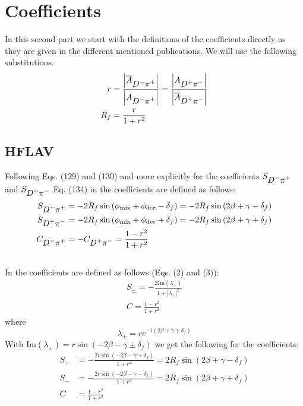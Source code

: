 \section{Coefficients}
\label{sec:coef}

In this second part we start with the definitions of the coefficients directly as they are given in the different mentioned publications.
We will use the following substitutions:
\begin{align*}
r &= \frac{\left|\overline{A}_{\mbox{\ensuremath{D^{-}\pi^{+}}}}\right|}{\left|A_{\mbox{\ensuremath{D^{-}\pi^{+}}}}\right|} = \frac{\left|A_{\mbox{\ensuremath{D^{+}\pi^{-}}}}\right|}{\left|\overline{A}_{\mbox{\ensuremath{D^{+}\pi^{-}}}}\right|}\\
R_f &= \frac{r}{1+r^2}
\end{align*}

\subsection{HFLAV}

Following Eqs. (129) and (130) and more explicitly for the coefficients $S_{\mbox{\ensuremath{D^{-}\pi^{+}}}}$ and $S_{\mbox{\ensuremath{D^{+}\pi^{-}}}}$ Eq. (134) in \cite{Amhis:2016xyh} the \CP
coefficients are defined as follows:
\begin{align}
S_{\mbox{\ensuremath{D^{-}\pi^{+}}}} &= -2R_f\sin\left(\phi_{\text{mix}}+\phi_{\text{dec}}-\delta_{f}\right) = -2R_f\sin\left(2\beta+\gamma-\delta_{f}\right)\\
S_{\mbox{\ensuremath{D^{+}\pi^{-}}}} &= -2R_f\sin\left(\phi_{\text{mix}}+\phi_{\text{dec}}+\delta_{f}\right) = -2R_f\sin\left(2\beta+\gamma+\delta_{f}\right)\\
C_{\mbox{\ensuremath{D^{-}\pi^{+}}}} &= -C_{\mbox{\ensuremath{D^{+}\pi^{-}}}} = \frac{1-r^2}{1+r^2}
\end{align}

\subsection{\babar}

In \cite{Aubert:2006tw} the \CP coefficients are defined as follows (Eqs. (2) and (3)):
\begin{align}
S_{\pm}=-\frac{2\text{Im}\left(\lambda_{\pm}\right)}{1+\left|\lambda_{\pm}\right|^2}\\
C=\frac{1-r^2}{1+r^2}
\end{align}
where
\begin{equation}
\lambda_\pm=r e^{-i\left(2\beta+\gamma\mp\delta_f\right)}
\end{equation}
With $\text{Im}\left(\lambda_\pm\right) = r\sin\left(-2\beta-\gamma\pm\delta_f\right)$ we get the following for the \CP coefficients:
\begin{align}
S_{+}&=-\frac{2r\sin\left(-2\beta-\gamma+\delta_f\right)}{1+r^2}=2R_f\sin\left(2\beta+\gamma-\delta_f\right)\\
S_{-}&=-\frac{2r\sin\left(-2\beta-\gamma-\delta_f\right)}{1+r^2}=2R_f\sin\left(2\beta+\gamma+\delta_f\right)\\
C&=\frac{1-r^2}{1+r^2}
\end{align}

